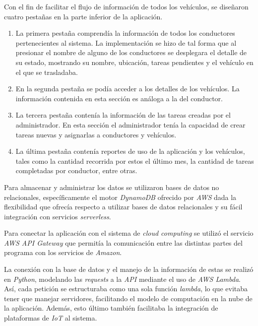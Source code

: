     Con el fin de facilitar el flujo de información de todos los vehículos, se diseñaron 
    cuatro pestañas en la parte inferior de la aplicación.
    \begin{enumerate}
      \item La primera pestaña comprendía la información de todos los conductores 
        pertenecientes al sistema.
        La implementación se hizo de tal forma que al presionar el nombre de alguno de 
        los conductores se desplegara el detalle de su estado, mostrando su nombre, 
        ubicación, tareas pendientes y el vehículo en el que se trasladaba.
      \item En la segunda pestaña se podía acceder a los detalles de los vehículos.
        La información contenida en esta sección es análoga a la del conductor.
      \item La tercera pestaña contenía la información de las tareas creadas por el 
        administrador.
        En esta sección el administrador tenía la capacidad de crear tareas nuevas y 
        asignarlas a conductores y vehículos.
      \item La última pestaña contenía reportes de uso de la aplicación y los vehículos, 
        tales como la cantidad recorrida por estos el último mes, la cantidad de tareas 
        completadas por conductor, entre otras.
    \end{enumerate}

    Para almacenar y administrar los datos se utilizaron bases de datos no relacionales, 
    específicamente el motor \textit{DynamoDB} ofrecido por \textit{AWS} dada la 
    flexibilidad que ofrecía respecto a utilizar bases de datos relacionales y su fácil 
    integración con servicios \textit{serverless}.

    Para conectar la aplicación con el sistema de \textit{cloud computing} se utilizó el 
    servicio \textit{AWS API Gateway} que permitía la comunicación entre las distintas 
    partes del programa con los servicios de \textit{Amazon}.

    La conexión con la base de datos y el manejo de la información de estas se realizó en
    \textit{Python}, modelando las \textit{requests} a la \textit{API} mediante el uso de
    \textit{AWS Lambda}. 
    Así, cada petición se estructuraba como una sola función \textit{lambda}, lo que 
    evitaba tener que manejar servidores, facilitando el modelo de computación en la nube
    de la aplicación.
    Además, esto último también facilitaba la integración de plataformas de \textit{IoT}
    al sistema.
    
